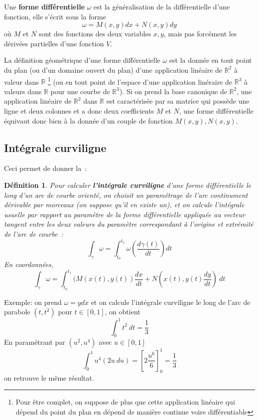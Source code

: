\documentclass[a4paper,11pt]{article}
\newtheorem{defn}[thm]{D\'efinition}
\begin{document}
\begin{giacjshere}
Une {\bf forme 
diff\'erentielle}
$\omega$ est la g\'en\'eralisation
de la diff\'erentielle d'une fonction, elle s'\'ecrit sous la forme
$$ \omega=M(x,y) dx + N(x,y) dy$$
o\`u $M$ et $N$ sont des fonctions 
des deux variables $x,y$, mais pas forc\'ement les d\'eriv\'ees
partielles d'une fonction $V$.
 
La d\'efinition g\'eom\'etrique d'une forme diff\'erentielle $\omega$
est la donn\'ee en tout point du plan (ou d'un domaine ouvert
du plan) d'une application lin\'eaire de $\mathbb{R}^2$ \`a valeur dans $\mathbb{R}$
\footnote{Pour \^etre complet, on suppose de plus que cette application
lin\'eaire qui d\'epend du point du plan en d\'epend de mani\`ere 
continue voire diff\'erentiable}
(ou en tout point de l'espace d'une application lin\'eraire de $\mathbb{R}^3$
\`a valeurs dans $\mathbb{R}$ pour une courbe de $\mathbb{R}^3$). 
Si on prend la base canonique de $\mathbb{R}^2$,
une application lin\'eaire de $\mathbb{R}^2$ dans $\mathbb{R}$ est caract\'eris\'ee
par sa matrice qui poss\`ede une ligne et deux colonnes et
a donc deux coefficients $M$ et $N$, une forme diff\'erentielle
\'equivaut donc bien \`a la donn\'ee d'un couple de fonction 
$M(x,y),N(x,y)$.

\subsection{Int\'egrale curviligne}
Ceci permet de donner la~:
\begin{defn}
Pour calculer {\bf l'int\'egrale 
curviligne}
 d'une forme diff\'erentielle 
le long d'un arc de courbe orient\'e,
on choisit un param\'etrage de l'arc continument d\'erivable par morceaux
(on suppose qu'il en existe un), 
et on calcule l'int\'egrale usuelle par rapport au param\`etre
de la forme diff\'erentielle appliqu\'ee au vecteur tangent entre les
deux valeurs du param\`etre correspondant \`a l'origine
et extr\'emit\'e de l'arc de courbe~:
$$ \int_\gamma \omega = \int_{t_0}^{t_1}
\omega\left(\frac{d\gamma(t)}{dt}\right) dt $$
En coordonn\'ees,
$$ \int_\gamma \omega =\int_{t_0}^{t_1} 
(M(x(t),y(t)) \frac{dx}{dt} + N(x(t),y(t) \frac{dy}{dt}) \ dt$$
\end{defn}
Exemple: on prend $\omega=ydx$ et on calcule l'int\'egrale
curviligne le long de l'arc de parabole $(t,t^2)$ pour $t\in[0,1]$,
on obtient
$$ \int_0^1 t^2 \ dt =\frac{1}{3}$$
En param\'etrant par $(u^2,u^4)$ avec $u\in[0,1]$
$$ \int_0^1 u^4 (2u \ du) = \left[2\frac{u^6}{6}\right]_0^1=\frac{1}{3}$$
on retrouve le m\^eme r\'esultat.


\end{giacjshere}
\end{document}
